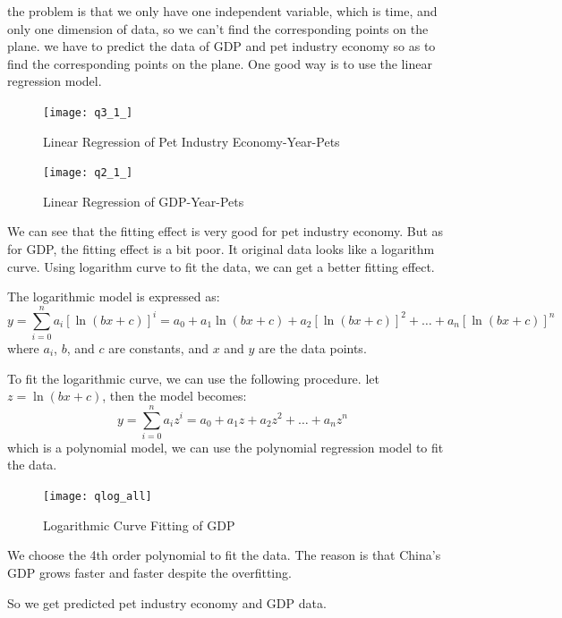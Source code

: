 \documentclass[withoutpreface,bwprint]{cumcmthesis} %
\begin{document}
\par the problem is that we only have one independent variable, which is time,
and only one dimension of data, so we can't find the corresponding points on the plane.
we have to predict the data of GDP and pet industry economy 
so as to find the corresponding points on the plane.
One good way is to use the linear regression model.
\begin{figure}[htbp]
	\centering
	\texttt{[image: q3\_1\_]}
	\caption{Linear Regression of Pet Industry Economy-Year-Pets}
\end{figure}
\begin{figure}[htbp]
	\centering
	\texttt{[image: q2\_1\_]}
	\caption{Linear Regression of GDP-Year-Pets}
\end{figure}
\par We can see that the fitting effect is very good for pet industry economy.
But as for GDP, the fitting effect is a bit poor. It original data looks like a logarithm curve.
Using logarithm curve to fit the data, we can get a better fitting effect.
\begin{definition}
The logarithmic model is expressed as:
\[
y = \sum_{i=0}^{n} a_i [\ln(bx + c)]^i = a_0 + a_1 \ln(bx + c) + a_2 [\ln(bx + c)]^2 + \dots + a_n [\ln(bx + c)]^n
\]
where \(a_i\), \(b\), and \(c\) are constants, and \(x\) and \(y\) are the data points.
\end{definition}
\begin{solution}
To fit the logarithmic curve, we can use the following procedure.
let \(z = \ln(bx + c)\), then the model becomes:
\[
y = \sum_{i=0}^{n} a_i z^i = a_0 + a_1 z + a_2 z^2 + \dots + a_n z^n
\]
which is a polynomial model, we can use the polynomial regression model to fit the data.
\end{solution}
\begin{figure}[htbp]
	\centering
	\texttt{[image: qlog\_all]}
	\caption{Logarithmic Curve Fitting of GDP}
\end{figure}
\par We choose the 4th order polynomial to fit the data.
The reason is that China's GDP grows faster and faster despite the overfitting.
\par So we get predicted pet industry economy and GDP data.
\end{document}
